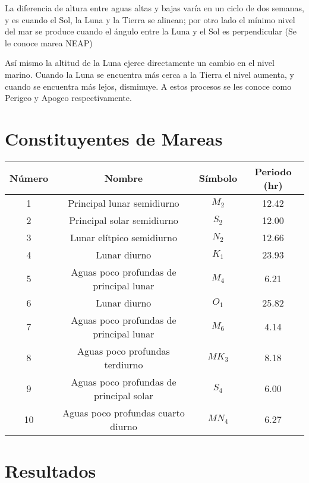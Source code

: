 \documentclass[12pt,a4paper]{article}
\begin{document}
La diferencia de altura entre aguas altas y bajas varía en un ciclo de dos semanas, y es cuando el Sol, la Luna y la Tierra se alinean; por otro lado el mínimo nivel del mar se produce cuando el ángulo entre la Luna y el Sol es perpendicular (Se le conoce marea NEAP)

Así mismo la altitud de la Luna ejerce directamente un cambio en el nivel marino. Cuando la Luna se encuentra más cerca a la Tierra el nivel aumenta, y cuando se encuentra más lejos, disminuye. A estos procesos se les conoce como Perigeo y Apogeo respectivamente. \\

\newpage

\section{Constituyentes de Mareas}

\begin{table}[!h]
\begin{center}
\begin{tabular}{|c|c|c|c|}
\hline 
\multicolumn{1}{|c|}{Número} & \multicolumn{1}{|c|}{Nombre} & \multicolumn{1}{|c|}{Símbolo} & \multicolumn{1}{c|}{Periodo (hr)} \\ 
\hline
1 & Principal lunar semidiurno &  $M_{2}$ & 12.42 \\ \hline
2&  Principal solar semidiurno & $S_{2}$ & 12.00 \\ \hline
3&  Lunar elítpico semidiurno & $N_{2}$ & 12.66 \\ \hline
4&  Lunar diurno & $K_{1}$ & 23.93 \\ \hline
5& Aguas poco profundas de principal lunar & $M_{4}$ & 6.21 \\ \hline
6&  Lunar diurno & $O_{1}$ & 25.82 \\ \hline
7& Aguas poco profundas de principal lunar & $M_{6}$ & 4.14 \\ \hline
8& Aguas poco profundas terdiurno & $MK_{3}$ & 8.18 \\ \hline
9& Aguas poco profundas de principal solar & $S_{4}$ & 6.00 \\ \hline
10& Aguas poco profundas cuarto diurno & $MN_{4}$ & 6.27 \\ \hline
\end{tabular}
\end{center}
\end{table}

\section{Resultados}
\end{document}
